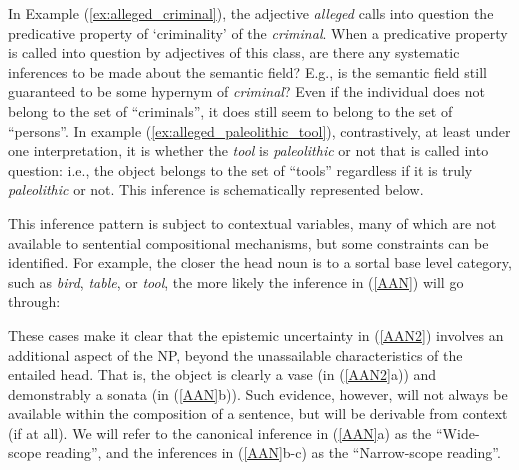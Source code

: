 \documentclass[10pt]{article}
\begin{document}
\noindent 
In Example (\ref{ex:alleged_criminal}), the adjective \emph{alleged} calls into question the predicative property of `criminality' of the \emph{criminal}. When a predicative property is called into question by adjectives of this class, are
there any systematic inferences to be made about the semantic field? E.g., is the semantic field still guaranteed to be some hypernym of
\emph{criminal}? Even if the individual does not belong to the set of
``criminals'', it does still seem to belong to the set of ``persons''. In
example (\ref{ex:alleged_paleolithic_tool}), contrastively, at least under one
interpretation, it is whether the \emph{tool} is \emph{paleolithic} or not that
is called into question: i.e., the object belongs to the set of ``tools''
regardless if it is truly \emph{paleolithic} or not.
This inference is schematically represented below.

\vspace{-0.5em}
\vspace{-0.5em}


\noindent 
This inference pattern is subject to contextual variables, many of which are not available to sentential compositional mechanisms, but some constraints can be identified. For example, the closer the head noun is to a sortal base level category, such as  {\it bird}, {\it table}, or {\it tool}, the more likely the inference in (\ref{AAN}) will go through:

\vspace{-0.5em}


\vspace{-0.5em}


\noindent These cases make it clear that the epistemic uncertainty in (\ref{AAN2}) involves an additional aspect of the NP,  beyond the unassailable characteristics of the entailed head. That is, the object is clearly a vase (in (\ref{AAN2}a)) and demonstrably a sonata (in (\ref{AAN}b)). Such evidence, however, will not always be available within the composition of a sentence, but will be derivable from context (if at all).  We will refer to the canonical inference in (\ref{AAN}a) as the ``Wide-scope reading'', and the inferences in 
(\ref{AAN}b-c) as the ``Narrow-scope reading''. 
\end{document}
